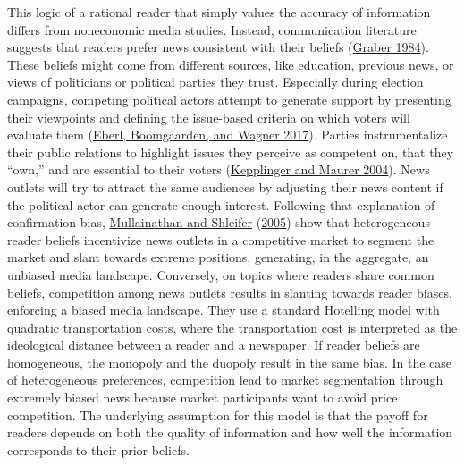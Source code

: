 \documentclass[
  12pt,
]{article}
\begin{document}
This logic of a rational reader that simply values the accuracy of
information differs from noneconomic media studies. Instead,
communication literature suggests that readers prefer news consistent
with their beliefs
(\protect\hyperlink{ref-graber_processing_1984}{Graber 1984}). These
beliefs might come from different sources, like education, previous
news, or views of politicians or political parties they trust.
Especially during election campaigns, competing political actors attempt
to generate support by presenting their viewpoints and defining the
issue-based criteria on which voters will evaluate them
(\protect\hyperlink{ref-eberl_one_2017}{Eberl, Boomgaarden, and Wagner
2017}). Parties instrumentalize their public relations to highlight
issues they perceive as competent on, that they ``own,'' and are
essential to their voters
(\protect\hyperlink{ref-kepplinger_einfluss_2004}{Kepplinger and Maurer
2004}). News outlets will try to attract the same audiences by adjusting
their news content if the political actor can generate enough interest.
Following that explanation of confirmation bias,
\protect\hyperlink{ref-mullainathan_market_2005}{Mullainathan and
Shleifer} (\protect\hyperlink{ref-mullainathan_market_2005}{2005}) show
that heterogeneous reader beliefs incentivize news outlets in a
competitive market to segment the market and slant towards extreme
positions, generating, in the aggregate, an unbiased media landscape.
Conversely, on topics where readers share common beliefs, competition
among news outlets results in slanting towards reader biases, enforcing
a biased media landscape. They use a standard Hotelling model with
quadratic transportation costs, where the transportation cost is
interpreted as the ideological distance between a reader and a
newspaper. If reader beliefs are homogeneous, the monopoly and the
duopoly result in the same bias. In the case of heterogeneous
preferences, competition lead to market segmentation through extremely
biased news because market participants want to avoid price competition.
The underlying assumption for this model is that the payoff for readers
depends on both the quality of information and how well the information
corresponds to their prior beliefs.
\end{document}
